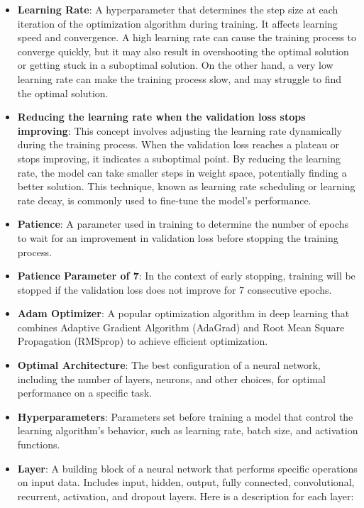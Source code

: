 \begin{itemize}
    \item \textbf{Learning Rate}: A hyperparameter that determines the step size at each iteration of the optimization algorithm during training. It affects learning speed and convergence. A high learning rate can cause the training process to converge quickly, but it may also result in overshooting the optimal solution or getting stuck in a suboptimal solution. On the other hand, a very low learning rate can make the training process slow, and may struggle to find the optimal solution.
    
    \item \textbf{Reducing the learning rate when the validation loss stops improving}: This concept involves adjusting the learning rate dynamically during the training process. When the validation loss reaches a plateau or stops improving, it indicates a suboptimal point. By reducing the learning rate, the model can take smaller steps in weight space, potentially finding a better solution. This technique, known as learning rate scheduling or learning rate decay, is commonly used to fine-tune the model's performance.
    
    \item \textbf{Patience}: A parameter used in training to determine the number of epochs to wait for an improvement in validation loss before stopping the training process.
    
    \item \textbf{Patience Parameter of 7}: In the context of early stopping, training will be stopped if the validation loss does not improve for 7 consecutive epochs.
    
    \item \textbf{Adam Optimizer}: A popular optimization algorithm in deep learning that combines Adaptive Gradient Algorithm (AdaGrad) and Root Mean Square Propagation (RMSprop) to achieve efficient optimization.
    
    \item \textbf{Optimal Architecture}: The best configuration of a neural network, including the number of layers, neurons, and other choices, for optimal performance on a specific task.
    
    \item \textbf{Hyperparameters}: Parameters set before training a model that control the learning algorithm's behavior, such as learning rate, batch size, and activation functions.
    
    \item \textbf{Layer}: A building block of a neural network that performs specific operations on input data. Includes input, hidden, output, fully connected, convolutional, recurrent, activation, and dropout layers. Here is a description for each layer:
    

\end{itemize}
